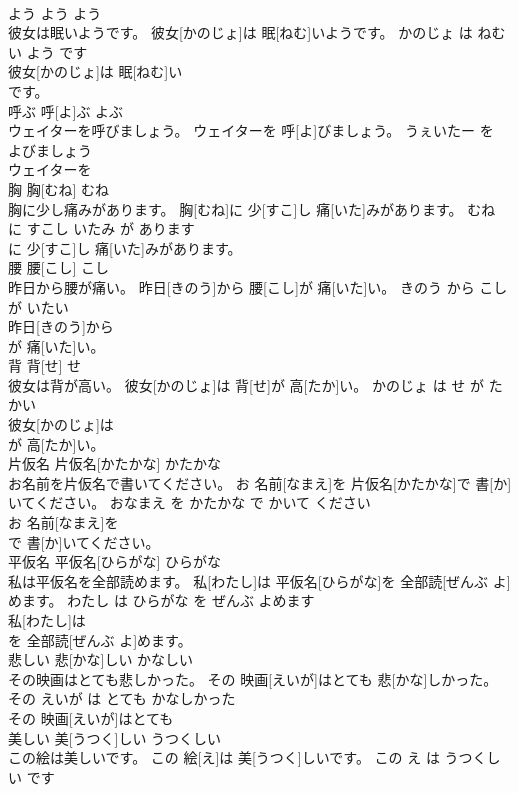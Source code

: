 \documentclass[8pt]{extreport}
\begin{document}
\begin{CJK}{UTF8}{min}
\\	よう	よう	よう	
\\	彼女は眠いようです。	彼女[かのじょ]は 眠[ねむ]いようです。	かのじょ は ねむい よう です	
\\	彼女[かのじょ]は 眠[ねむ]い
\\	です。		
\\	呼ぶ	呼[よ]ぶ	よぶ	
\\	ウェイターを呼びましょう。	ウェイターを 呼[よ]びましょう。	うぇいたー を よびましょう	
\\	ウェイターを
\\	胸	胸[むね]	むね	
\\	胸に少し痛みがあります。	胸[むね]に 少[すこ]し 痛[いた]みがあります。	むね に すこし いたみ が あります	
\\	に 少[すこ]し 痛[いた]みがあります。		
\\	腰	腰[こし]	こし	
\\	昨日から腰が痛い。	昨日[きのう]から 腰[こし]が 痛[いた]い。	きのう から こし が いたい	
\\	昨日[きのう]から
\\	が 痛[いた]い。		
\\	背	背[せ]	せ	
\\	彼女は背が高い。	彼女[かのじょ]は 背[せ]が 高[たか]い。	かのじょ は せ が たかい	
\\	彼女[かのじょ]は
\\	が 高[たか]い。		
\\	片仮名	片仮名[かたかな]	かたかな	
\\	お名前を片仮名で書いてください。	お 名前[なまえ]を 片仮名[かたかな]で 書[か]いてください。	おなまえ を かたかな で かいて ください	
\\	お 名前[なまえ]を
\\	で 書[か]いてください。		
\\	平仮名	平仮名[ひらがな]	ひらがな	
\\	私は平仮名を全部読めます。	私[わたし]は 平仮名[ひらがな]を 全部読[ぜんぶ よ]めます。	わたし は ひらがな を ぜんぶ よめます	
\\	私[わたし]は
\\	を 全部読[ぜんぶ よ]めます。		
\\	悲しい	悲[かな]しい	かなしい	
\\	その映画はとても悲しかった。	その 映画[えいが]はとても 悲[かな]しかった。	その えいが は とても かなしかった	
\\	その 映画[えいが]はとても
\\	美しい	美[うつく]しい	うつくしい	
\\	この絵は美しいです。	この 絵[え]は 美[うつく]しいです。	この え は うつくしい です	

\end{CJK}
\end{document}
